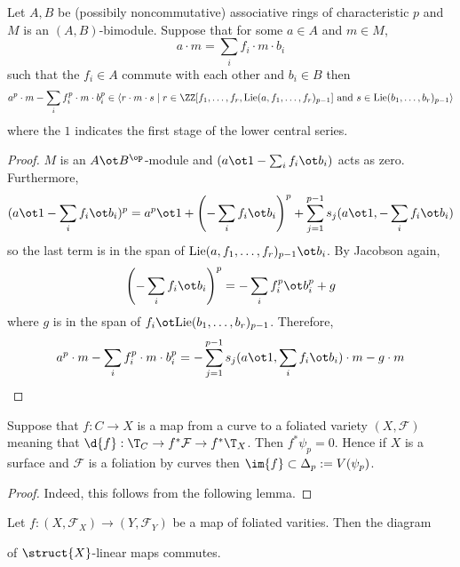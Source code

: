 \documentclass[12pt]{article}
\renewcommand{\F}{\mathcal{F}}
\begin{document}
\begin{lemma}
Let $A,B$ be (possibily noncommutative) associative rings of characteristic $p$ and $M$ is an $(A,B)$-bimodule. Suppose that for some $a \in A$ and $m \in M$,
\[ a \cdot m = \sum_i f_i \cdot m \cdot b_i \]
such that the $f_i \in A$ commute with each other and $b_i \in B$ then
\[ a^p \cdot m - \sum_i f_i^p \cdot m \cdot b_i^p \in \left< r \cdot m \cdot s \mid r \in \ZZ[f_1, \dots, f_r, \Lie(a, f_1, \dots, f_r)_{p-1}] \text{ and } s \in \Lie(b_1, \dots, b_r)_{p-1} \right>  \] 
where the $1$ indicates the first stage of the lower central series.
\end{lemma}


\begin{proof}
$M$ is an $A \ot B^\op$-module and $(a \ot 1 - \sum_i f_i \ot b_i)$ acts as zero. Furthermore,
\[ (a \ot 1 - \sum_i f_i \ot b_i)^p = a^p \ot 1 + \left(- \sum_i f_i \ot b_i \right)^p + \sum_{j = 1}^{p-1} s_j(a \ot 1, -\sum_i f_i \ot b_i) \]
so the last term is in the span of $\Lie(a, f_1, \dots, f_r)_{p-1} \ot b_i$. By Jacobson again,
\[  \left(- \sum_i f_i \ot b_i \right)^p = - \sum_i f_i^p \ot b_i^p + g \]
where $g$ is in the span of $f_i \ot \Lie(b_1, \dots, b_r)_{p-1}$. Therefore,
\[ a^p \cdot m - \sum_i f_i^p \cdot m \cdot b_i^p = -\sum_{j = 1}^{p-1} s_j(a \ot 1, \sum_i f_i \ot b_i) \cdot m  -g \cdot m \]
\end{proof}

\begin{prop}
Suppose that $f : C \to X$ is a map from a curve to a foliated variety $(X, \F)$ meaning that $\d{f} : \T_C \to f^* \F \to f^* \T_X$. Then $f^* \psi_p = 0$. Hence if $X$ is a surface and $\F$ is a foliation by curves then $\im{f} \subset \Delta_p := V(\psi_p)$.
\end{prop}

\begin{proof}
Indeed, this follows from the following lemma.
\end{proof}

\begin{prop}
Let $f : (X, \F_X) \to (Y, \F_Y)$ be a map of foliated varities. Then the diagram
\begin{center}
\end{center}
of $\struct{X}$-linear maps commutes.
\end{prop}
\end{document}
